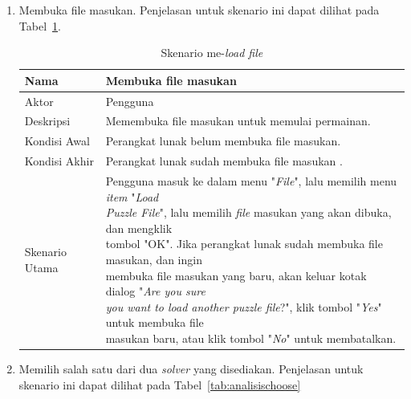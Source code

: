 \begin{enumerate}
\item Membuka {file} masukan. Penjelasan untuk skenario ini dapat dilihat pada Tabel~\ref{tab:analisisload}.

\begin{table}
\centering
\captionsetup{justification=centering}
\caption[Skenario me-\textit{load file}]{Skenario me-\textit{load file}}
\begin{tabular}{| l || l |}
\hline
Nama & Membuka {file} masukan \\
\hline
Aktor & Pengguna \\
\hline
Deskripsi & Memembuka file masukan untuk memulai permainan. \\
\hline
Kondisi Awal & Perangkat lunak belum membuka {file} masukan. \\
\hline
Kondisi Akhir & Perangkat lunak sudah membuka {file} masukan .\\
\hline
Skenario Utama & \makecell[l]{Pengguna masuk ke dalam menu "\textit{File}", lalu memilih menu \textit{item} "\textit{Load} \\ \textit{Puzzle File}", lalu memilih \textit{file} masukan yang akan dibuka, dan mengklik \\ tombol "OK". Jika perangkat lunak sudah membuka {file} masukan, dan ingin \\ membuka {file} masukan yang baru, akan keluar kotak dialog "\textit{Are you sure} \\  \textit{you want to load another puzzle file}?", klik tombol "\textit{Yes}" untuk membuka {file} \\ masukan baru, atau klik tombol "\textit{No}" untuk membatalkan.} \\
\hline
\end{tabular}
\label{tab:analisisload}
\end{table}

\item Memilih salah satu dari dua \textit{solver} yang disediakan. Penjelasan untuk skenario ini dapat dilihat pada Tabel~\ref{tab:analisischoose}


\end{enumerate}

